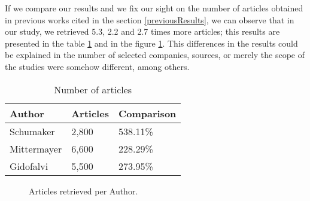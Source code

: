 If we compare our results and we fix our sight on the number of articles obtained in previous works cited in the section \ref{previousResults}, we can observe that in our study, we retrieved 5.3, 2.2 and 2.7 times more articles; this results are presented in the table \ref{tab:numberArticles} and in the figure \ref{fig:Results3}. This differences in the results could be explained in the number of selected companies, sources, or merely the scope of the studies were somehow different,  among others.

\begin{table}\centering
	\caption{Number of articles}\label{tab:numberArticles}
   	\begin{tabular}{ | p{3cm\textwidth} | p{3cm\textwidth} | p{3cm\textwidth} |}
   	\hline

\textbf{Author}           & \textbf{Articles} & \textbf{Comparison} \\\hline

Schumaker \cite{SCH2012}&2,800 & 538.11\%                 \\\hline
Mittermayer \cite{MM2004}&6,600 &  228.29\%                \\\hline
Gidofalvi \cite{GG2001}& 5,500 & 273.95\%                          \\\hline

    \end{tabular}
\end{table}

\begin{figure}\centering


	\caption{Articles retrieved per Author.}\label{fig:Results3}
\end{figure}



